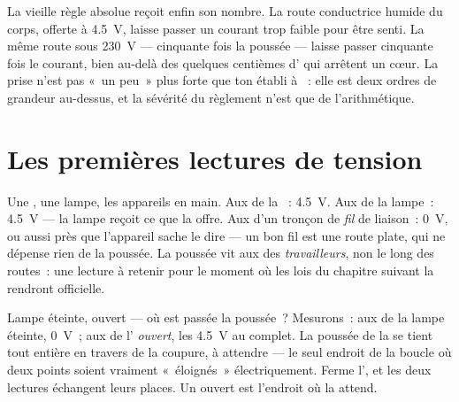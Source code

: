 \begin{remark}\label{rem:g8:voltage-voltmeter:mains}
La vieille règle absolue reçoit enfin son nombre. La route
conductrice humide du corps, offerte à \qty{4.5}{V}, laisse passer un
courant trop faible pour être senti. La même route sous \qty{230}{V}
--- cinquante fois la poussée --- laisse passer cinquante fois le
courant, bien au-delà des quelques centièmes d' qui arrêtent un
cœur. La prise n'est pas «~un peu~» plus forte que ton établi à
~: elle est deux ordres de grandeur au-dessus, et la sévérité du
règlement n'est que de l'arithmétique.
\end{remark}

\section{Les premières lectures de tension}

\begin{example}\label{ex:g8:voltage-voltmeter:readings}
Une , une lampe, les appareils en main. Aux  de la ~:
\qty{4.5}{V}. Aux  de la lampe~: \qty{4.5}{V} --- la lampe
reçoit ce que la  offre. Aux  d'un tronçon de \emph{fil} de
liaison~: \qty{0}{V}, ou aussi près que l'appareil sache le dire ---
un bon fil est une route plate, qui ne dépense rien de la poussée. La
poussée vit aux  des \emph{travailleurs}, non le long des
routes~: une lecture à retenir pour le moment où les lois du chapitre
suivant la rendront officielle.
\end{example}

\begin{example}\label{ex:g8:voltage-voltmeter:openswitch}
Lampe éteinte,  ouvert --- où est passée la poussée~?
Mesurons~: aux  de la lampe éteinte, \qty{0}{V}~; aux  de
l'\emph{ ouvert}, les \qty{4.5}{V} au complet. La poussée
de la  se tient tout entière en travers de la coupure, à
attendre --- le seul endroit de la boucle où deux points soient
vraiment «~éloignés~» électriquement. Ferme l', et les
deux lectures échangent leurs places. Un  ouvert est
l'endroit où la  attend.
\end{example}

